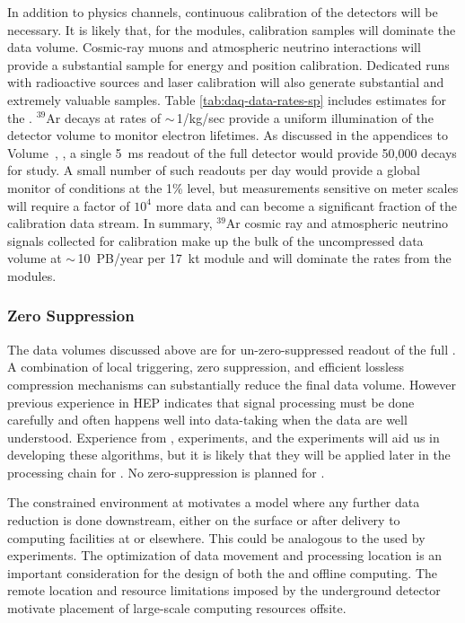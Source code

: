 In addition to physics channels, continuous calibration of the detectors will be necessary.  It is likely that, for the  modules, calibration samples will  dominate the data volume. Cosmic-ray muons and atmospheric neutrino interactions will provide a substantial sample for energy and position calibration.  Dedicated runs with radioactive sources and laser calibration will also generate substantial and extremely valuable samples. Table \ref{tab:daq-data-rates-sp} includes estimates for the %
. 
$^{39}$Ar decays at rates of $\sim\,$1/kg/sec provide a uniform illumination of the detector volume to monitor electron lifetimes. As discussed in the appendices to %
Volume~\volnumberphysics{}, \voltitlephysics{},  a single \SI{5}{ms} readout of the full detector would provide 50,000 decays for study.  A small number of such readouts per day would provide a global monitor of conditions at the 1\% level, but measurements sensitive on meter scales will require a factor of $10^4$ more data and can become a significant fraction of the calibration data stream. In summary, $^{39}$Ar cosmic ray and atmospheric neutrino signals collected for calibration make up the bulk of the uncompressed  data volume at $\sim\,$\SI{10}{PB/year} per \SI{17}{kt} module and will dominate the rates from the  modules.  


\subsubsection{Zero Suppression}

The data volumes discussed above are for un-zero-suppressed readout of the full . A combination of local triggering, zero suppression, and  efficient lossless compression mechanisms can substantially reduce the final data volume. However previous experience in HEP indicates that signal processing must be done carefully and often happens well into data-taking when the data are well understood. 
Experience from  ,  experiments, and the  experiments will aid us in developing these algorithms, but it is likely that they will be applied later in the processing chain for .  No zero-suppression is planned for .

The constrained environment at  motivates a model where any further data reduction is done downstream, either on the surface or after delivery to computing facilities at  or elsewhere. This could be analogous to the  used by  experiments.  The %
optimization of data movement and processing location is an important consideration for the design of both the  and offline computing. %
The remote location and resource limitations imposed by the underground detector motivate placement of large-scale computing resources offsite. 



